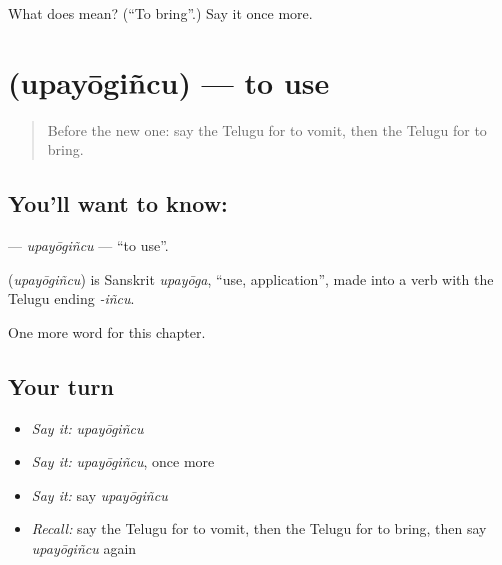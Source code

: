 \begin{tcolorbox}[breakable,colback=teal!4,colframe=teal!35!black,title={Before you move on}]
What does  mean? (\textquotedblleft{}To bring\textquotedblright{}.) Say it once more.
\end{tcolorbox}
\section[\texorpdfstring{\te{ఉపయోగించు} (upayōgiñcu)}{ఉపయోగించు (upayōgiñcu)}]{ (upayōgiñcu) — to use}

\label{lesson:TE-C242-upayogincu}



\begin{quote}
Before the new one: say the Telugu for to vomit, then the Telugu for to bring.
\end{quote}

\subsection*{You'll want to know: }
\textbf{} — \emph{upayōgiñcu} — \textquotedblleft{}to use\textquotedblright{}.

\begin{cousinweb}
\textbf{} (\emph{upayōgiñcu}) is Sanskrit \emph{upayōga}, \textquotedblleft{}use, application\textquotedblright{}, made into a verb with the Telugu ending \emph{-iñcu}.
\end{cousinweb}

\begin{grammarlens}[title={What you've built}]
One more word for this chapter.
\end{grammarlens}

\subsection*{Your turn}
\begin{itemize}
\raggedright
  \item \emph{Say it:} \emph{upayōgiñcu}
  \item \emph{Say it:} \emph{upayōgiñcu}, once more
  \item \emph{Say it:} say \emph{upayōgiñcu}
  \item \emph{Recall:} say the Telugu for to vomit, then the Telugu for to bring, then say \emph{upayōgiñcu} again
\end{itemize}

